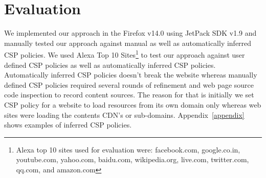 \section{Evaluation}
\label{sec:eval}

We implemented our approach in the Firefox v14.0 using JetPack SDK
v1.9 and manually tested our approach against manual as well as
automatically inferred CSP policies. We used Alexa Top 10
Sites\footnote[2]{Alexa top 10 sites used for evaluation were:
  facebook.com, google.co.in, youtube.com, yahoo.com, baidu.com,
  wikipedia.org, live.com, twitter.com, qq.com, and amazon.com} to
test our approach against user defined CSP policies as well as
automatically inferred CSP policies. Automatically inferred CSP
policies doesn't break the website whereas manually defined CSP
policies required several rounds of refinement and web page source
code inspection to record content sources. The reason for that is
initially we set CSP policy for a website to load resources from its
own domain only whereas web sites were loading the contents CDN's or
sub-domains.  Appendix~\ref{appendix} shows examples of inferred CSP
policies.
